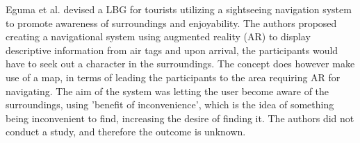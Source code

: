 

Eguma et al. devised a LBG for tourists utilizing a sightseeing navigation system to promote awareness of surroundings and enjoyability\cite{HideAndSeek}. The authors proposed creating a navigational system using augmented reality (AR) to display descriptive information from air tags and upon arrival, the participants would have to seek out a character in the surroundings. The concept does however make use of a map, in terms of leading the participants to the area requiring AR for navigating. The aim of the system was letting the user become aware of the surroundings, using 'benefit of inconvenience', which is the idea of something being inconvenient to find, increasing the desire of finding it. The authors did not conduct a study, and therefore the outcome is unknown.


